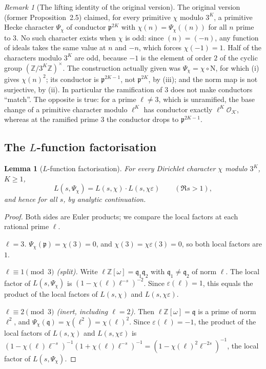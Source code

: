 \documentclass[12pt]{amsart}
\theoremstyle{plain}
\newtheorem{lemma}[theorem]{Lemma}
\theoremstyle{definition}
\theoremstyle{remark}
\newtheorem{remark}[theorem]{Remark}
\newcommand{\Z}{\mathbb{Z}}
\newcommand{\Zomega}{\Z[\omega]}
\newcommand{\K}{\mathcal{K}}          %
\newcommand{\OK}{\mathcal{O}_{\K}}
\newcommand{\Nf}{\mathrm{N}}          %
\newcommand{\pp}{\mathfrak{p}}        %
\newcommand{\qq}{\mathfrak{q}}        %
\begin{document}
\begin{remark}[The lifting identity of the original version]
\label{rem:nolift}
The original version (former Proposition~2.5) claimed, for every primitive
$\chi$ modulo $3^K$, a primitive Hecke character $\Psi_\chi$ of conductor
$\pp^{2K}$ with $\chi(n) = \Psi_\chi((n))$ for all $n$ prime to $3$. No
such character exists when $\chi$ is odd: since $(n) = (-n)$, any function
of ideals takes the same value at $n$ and $-n$, which forces
$\chi(-1) = 1$. Half of the characters modulo $3^K$ are odd, because $-1$ is
the element of order $2$ of the cyclic group $(\Z/3^K\Z)^\times$. The
construction actually given was $\Psi_\chi = \chi\circ\Nf$, for which (i)
gives $\chi(n)^2$; its conductor is $\pp^{2K-1}$, not $\pp^{2K}$, by (iii);
and the norm map is not surjective, by (ii). In particular the ramification
of $3$ does not make conductors ``match''. The opposite is true: for a prime
$\ell \neq 3$, which is unramified, the base change of a primitive character
modulo $\ell^K$ has conductor exactly $\ell^K\OK$, whereas at the ramified
prime $3$ the conductor drops to $\pp^{2K-1}$.
\end{remark}

\subsection{The $L$-function factorisation}

\begin{lemma}[$L$-function factorisation]
\label{lem:factor}
For every Dirichlet character $\chi$ modulo $3^K$, $K \geq 1$,
\[
  L(s, \Psi_\chi) = L(s, \chi) \cdot L(s, \chi\varepsilon) \qquad (\Re s > 1),
\]
and hence for all $s$, by analytic continuation.
\end{lemma}

\begin{proof}
Both sides are Euler products; we compare the local factors at each rational
prime $\ell$.

\emph{$\ell = 3$.} $\Psi_\chi(\pp) = \chi(3) = 0$, and $\chi(3) =
\chi\varepsilon(3) = 0$, so both local factors are $1$.

\emph{$\ell \equiv 1 \pmod{3}$ (split).} Write $\ell\Zomega = \qq_1\qq_2$
with $\qq_1 \neq \qq_2$ of norm $\ell$. The local factor of
$L(s, \Psi_\chi)$ is $(1-\chi(\ell)\ell^{-s})^{-2}$. Since
$\varepsilon(\ell) = 1$, this equals the product of the local factors of
$L(s,\chi)$ and $L(s,\chi\varepsilon)$.

\emph{$\ell \equiv 2 \pmod{3}$ (inert, including $\ell = 2$).} Then
$\ell\Zomega = \qq$ is a prime of norm $\ell^2$, and $\Psi_\chi(\qq) =
\chi(\ell^2) = \chi(\ell)^2$. Since $\varepsilon(\ell) = -1$, the product of
the local factors of $L(s,\chi)$ and $L(s,\chi\varepsilon)$ is
$(1-\chi(\ell)\ell^{-s})^{-1}(1+\chi(\ell)\ell^{-s})^{-1}
= (1-\chi(\ell)^2\ell^{-2s})^{-1}$, the local factor of $L(s,\Psi_\chi)$.
\end{proof}
\end{document}
